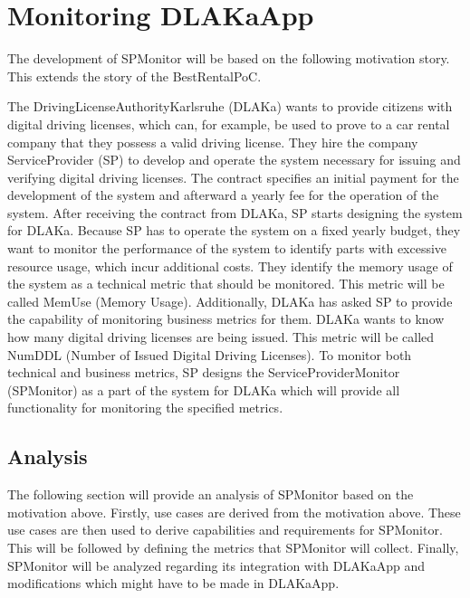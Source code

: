 \chapter{Monitoring DLAKaApp}


The development of SPMonitor will be based on the following motivation story.
This extends the story of the BestRentalPoC.

The DrivingLicenseAuthorityKarlsruhe (DLAKa) wants to provide citizens with digital driving licenses,
which can, for example, be used to prove to a car rental company that they possess a valid driving license.
They hire the company ServiceProvider (SP) to develop and operate the system necessary for issuing and verifying
digital driving licenses. The contract specifies an initial payment for the development of the system
and afterward a yearly fee for the operation of the system.
After receiving the contract from DLAKa, SP starts designing the system
for DLAKa. Because SP has to operate the system on a fixed yearly budget,
they want to monitor the performance of the system to identify parts with excessive resource usage, which
incur additional costs. They identify the memory usage of the system as a technical metric that should be monitored.
This metric will be called MemUse (Memory Usage).
Additionally, \Gls{DLAKa} has asked SP to provide the capability of monitoring business metrics for them.
\Gls{DLAKa} wants to know how many digital driving licenses are being issued. 
This metric will be called NumDDL (Number of Issued Digital Driving Licenses).
To monitor both technical and business metrics, SP designs the ServiceProviderMonitor (SPMonitor) as a part
of the system for \Gls{DLAKa} which will provide all functionality for monitoring the specified metrics.

\section{Analysis}

The following section will provide an analysis of SPMonitor based on the motivation above.
Firstly, use cases are derived from the motivation above. These use cases are then used
to derive capabilities and requirements for SPMonitor. This will be followed by defining
the metrics that SPMonitor will collect. Finally, SPMonitor will be analyzed regarding its
integration with DLAKaApp and modifications which might have to be made in DLAKaApp.


